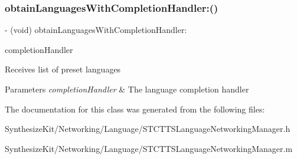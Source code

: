\subsubsection{\texorpdfstring{obtain\+Languages\+With\+Completion\+Handler\+:()}{obtainLanguagesWithCompletionHandler:()}}
{\footnotesize\ttfamily -\/ (void) obtain\+Languages\+With\+Completion\+Handler\+: \begin{DoxyParamCaption}\item[{(Completion\+Handler)}]{completion\+Handler }\end{DoxyParamCaption}}

Receives list of preset languages 
\begin{DoxyParams}{Parameters}
{\em completion\+Handler} & The language completion handler \\
\hline
\end{DoxyParams}


The documentation for this class was generated from the following files\+:\begin{DoxyCompactItemize}
\item 
Synthesize\+Kit/\+Networking/\+Language/S\+T\+C\+T\+T\+S\+Language\+Networking\+Manager.\+h\item 
Synthesize\+Kit/\+Networking/\+Language/S\+T\+C\+T\+T\+S\+Language\+Networking\+Manager.\+m\end{DoxyCompactItemize}
